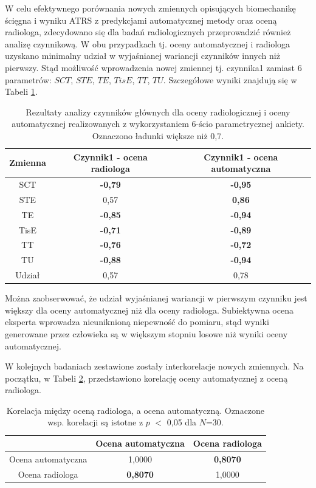 W celu efektywnego porównania nowych zmiennych opisujących biomechanikę ścięgna i wyniku ATRS z predykcjami automatycznej metody oraz oceną radiologa, zdecydowano się dla badań radiologicznych przeprowadzić również analizę czynnikową. W obu przypadkach tj. oceny automatycznej i radiologa uzyskano minimalny udział w wyjaśnianej wariancji czynników innych niż pierwszy. Stąd możliwość wprowadzenia nowej zmiennej tj. czynnika1 zamiast 6 parametrów: $SCT$, $STE$, $TE$, $TisE$, $TT$, $TU$. Szczegółowe wyniki znajdują się w Tabeli \ref{tab:pca-gt-pred}.

\begin{table}[h]
	\centering
	\setlength{\tabcolsep}{3pt}
	\setlength\extrarowheight{2pt}
	\caption{Rezultaty analizy czynników głównych dla oceny radiologicznej i oceny automatycznej realizowanych z wykorzystaniem 6-ścio parametrycznej ankiety. Oznaczono ładunki większe niż 0,7.}
	\label{tab:pca-gt-pred}
	\begin{tabular}{c|c|c}
		Zmienna&Czynnik1 - ocena radiologa&Czynnik1 - ocena automatyczna \\
		\hline
		SCT&\textbf{-0,79}&\textbf{-0,95}\\
		\hline
		STE&0,57&\textbf{0,86}\\
		\hline
		TE&\textbf{-0,85}&\textbf{-0,94}\\
		\hline
		TisE&\textbf{-0,71}&\textbf{-0,89}\\
		\hline
		TT&\textbf{-0,76}&\textbf{-0,72}\\
		\hline
		TU&\textbf{-0,88}&\textbf{-0,94}\\
		\hline	
		Udział&0,57&0,78\\
		\hline	
	\end{tabular}
\end{table}

Można zaobserwować, że udział wyjaśnianej wariancji w pierwszym czynniku jest większy dla oceny automatycznej niż dla oceny radiologa. Subiektywna ocena eksperta wprowadza nieuniknioną niepewność do pomiaru, stąd wyniki generowane przez człowieka są w większym stopniu losowe niż wyniki oceny automatycznej. 

W kolejnych badaniach zestawione zostały interkorelacje nowych zmiennych. Na początku, w Tabeli \ref{tab:gtVSpred}, przedstawiono korelację oceny automatycznej z oceną radiologa.


\begin{table}[h]
	\centering
	\setlength{\tabcolsep}{3pt}
	\setlength\extrarowheight{2pt}
	\caption{Korelacja między oceną radiologa, a ocena automatyczną. Oznaczone wsp. korelacji są istotne z $p$ $<$ 0,05 dla $N$=30.}
	\label{tab:gtVSpred}
	\begin{tabular}{c|c|c}
		&Ocena automatyczna &Ocena radiologa \\
		\hline
		Ocena automatyczna&1,0000&\textbf{0,8070}\\
		\hline
		Ocena radiologa&\textbf{0,8070}&1,0000\\
		\hline	
	\end{tabular}
\end{table}

